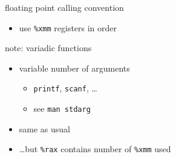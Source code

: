 
\begin{frame}{floating point calling convention}
    \begin{itemize}
    \item use {\tt \%xmm} registers in order
    \end{itemize}
\end{frame}

\begin{frame}[fragile,label=variadic]{note: variadic functions}
    \begin{itemize}
    \item variable number of arguments
        \begin{itemize}
        \item {\tt printf}, {\tt scanf}, \ldots
        \item see {\tt man stdarg}
        \end{itemize}
    \vspace{.5cm}
    \item same as usual 
    \item \ldots but \lstinline|%rax| contains number of {\tt \%xmm} used
    \end{itemize}
\end{frame}

